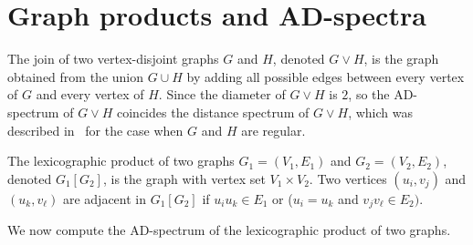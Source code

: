 \documentclass[12pt]{article}
\numberwithin{equation}{section}
\begin{document}
	
	\section{Graph products and AD-spectra}\label{s7}
	
	The join of two vertex-disjoint graphs $G$ and $H$, denoted $G \vee H$, 
	is the graph obtained from the union $G \cup H$ by adding all possible edges 
	between every vertex of $G$ and every vertex of $H$. Since the diameter of  $G \vee H$ is $2$, so the AD-spectrum of $G \vee H$ coincides the distance spectrum of $G \vee H$, which was described in~\cite[Theorem 2]{stevanovic2009thedistance} for the case when $G$ and $H$ are regular. 


 


 The lexicographic product of two graphs $G_1 = (V_1, E_1)$ and $G_2 = (V_2, E_2)$, denoted $G_1 [G_2]$, is the graph with vertex set $V_1 \times V_2$. 
Two vertices $(u_i, v_j)$ and $(u_k, v_\ell)$ are adjacent in $G_1[G_2]$ if $u_i u_k \in E_1$ or ($u_i = u_k$ and $v_j v_\ell \in E_2)$.
	
	We now compute the AD-spectrum of the lexicographic product of two graphs.
	
\end{document}

